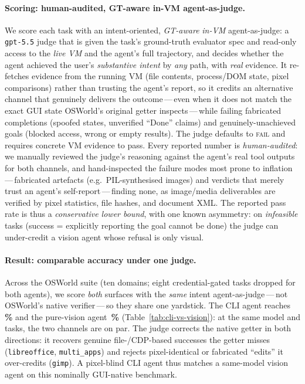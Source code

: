 \paragraph{Scoring: human-audited, GT-aware in-VM agent-as-judge.}
We score each task with an intent-oriented, \emph{GT-aware} \emph{in-VM}
agent-as-judge: a \texttt{gpt-5.5} judge that is given the task's ground-truth
evaluator spec and read-only access to the \emph{live VM} and the agent's full
trajectory, and decides whether the agent achieved the user's
\emph{substantive intent} by \emph{any} path, with \emph{real} evidence. It
re-fetches evidence from the running VM (file contents, process/DOM state,
pixel comparisons) rather than trusting the agent's report, so it credits an
alternative channel that genuinely delivers the outcome\,---\,even when it does
not match the exact GUI state OSWorld's original getter inspects\,---\,while
failing fabricated completions (spoofed states, unverified ``Done'' claims) and
genuinely-unachieved goals (blocked access, wrong or empty results). The judge
defaults to \textsc{fail} and requires concrete VM evidence to pass. Every
reported number is \emph{human-audited}: we manually reviewed the judge's
reasoning against the agent's real tool outputs for both channels, and
hand-inspected the failure modes most prone to inflation\,---\,fabricated
artefacts (e.g.\ PIL-synthesised images) and verdicts that merely trust an
agent's self-report\,---\,finding none, as image/media deliverables are verified
by pixel statistics, file hashes, and document XML. The reported pass rate is
thus a \emph{conservative lower bound}, with one known asymmetry: on
\emph{infeasible} tasks (success = explicitly reporting the goal cannot be done)
the judge can under-credit a vision agent whose refusal is only visual.

\paragraph{Result: comparable accuracy under one judge.}
\label{app:cli-osworld-results}
Across the OSWorld suite (ten domains; eight credential-gated tasks dropped for
both agents), we score \emph{both} surfaces with the \emph{same} intent
agent-as-judge\,---\,not OSWorld's native verifier\,---\,so they share one
yardstick. The CLI agent reaches \textbf{\cliOswIntent{}\,\%} and the pure-vision
agent \textbf{\cuaVisionIntent{}\,\%} (Table~\ref{tab:cli-vs-vision}): at the
same model and tasks, the two channels are on par. The judge corrects the
native getter in both directions: it recovers
genuine file-/CDP-based successes the getter misses (\texttt{libreoffice},
\texttt{multi\_apps}) and rejects pixel-identical or fabricated ``edits'' it
over-credits (\texttt{gimp}). A pixel-blind CLI agent thus matches a same-model
vision agent on this nominally GUI-native benchmark.

